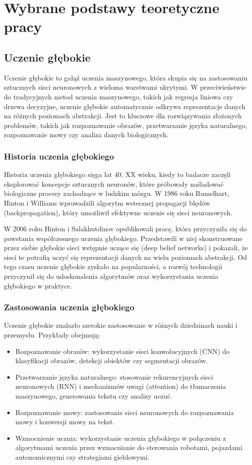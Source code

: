 \chapter{Wybrane podstawy teoretyczne pracy}

\section{Uczenie głębokie}
Uczenie głębokie to gałąź uczenia maszynowego, która skupia się na zastosowaniu sztucznych sieci neuronowych z wieloma warstwami ukrytymi. W przeciwieństwie do tradycyjnych metod uczenia maszynowego, takich jak regresja liniowa czy drzewa decyzyjne, uczenie głębokie automatycznie odkrywa reprezentacje danych na różnych poziomach abstrakcji. Jest to kluczowe dla rozwiązywania złożonych problemów, takich jak rozpoznawanie obrazów, przetwarzanie języka naturalnego, rozpoznawanie mowy czy analiza danych biologicznych.

\subsection{Historia uczenia głębokiego}
Historia uczenia głębokiego sięga lat 40. XX wieku, kiedy to badacze zaczęli eksplorować koncepcje sztucznych neuronów, które próbowały naśladować biologiczne procesy zachodzące w ludzkim mózgu. W 1986 roku Rumelhart, Hinton i Williams wprowadzili algorytm wstecznej propagacji błędów (backpropagation), który umożliwił efektywne uczenie się sieci neuronowych.

W 2006 roku Hinton i Salakhutdinov opublikowali pracę, która przyczyniła się do powstania współczesnego uczenia głębokiego. Przedstawili w niej skonstruowane przez siebie głębokie sieci wstępnie uczące się (deep belief networks) i pokazali, że sieci te potrafią uczyć się reprezentacji danych na wielu poziomach abstrakcji. Od tego czasu uczenie głębokie zyskało na popularności, a rozwój technologii przyczynił się do udoskonalenia algorytmów oraz wykorzystania uczenia głębokiego w praktyce.

\subsection{Zastosowania uczenia głębokiego}
Uczenie głębokie znalazło szerokie zastosowanie w różnych dziedzinach nauki i przemysłu. Przykłady obejmują:
\begin{itemize}
\item Rozpoznawanie obrazów: wykorzystanie sieci konwolucyjnych (CNN) do klasyfikacji obrazów, detekcji obiektów czy segmentacji obrazów.
\item Przetwarzanie języka naturalnego: stosowanie rekurencyjnych sieci neuronowych (RNN) i mechanizmów uwagi (attention) do tłumaczenia maszynowego, generowania tekstu czy analizy uczuć.
\item Rozpoznawanie mowy: zastosowanie sieci neuronowych do rozpoznawania mowy i konwersji mowy na tekst.
\item Wzmocnienie ucznia: wykorzystanie uczenia głębokiego w połączeniu z algorytmami uczenia przez wzmacnianie do sterowania robotami, pojazdami autonomicznymi czy strategiami giełdowymi.
\end{itemize}

